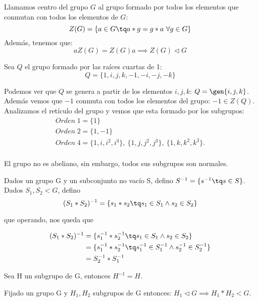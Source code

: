\documentclass[nochap]{apuntes}
\begin{document}
\begin{defn}
	Llamamos centro del grupo $G$ al grupo formado por todos los elementos que conmutan con todos los elementos de $G$:\\
	\[ Z(G) = \{ a\in G\tq a\ast g = g\ast a\ \forall g\in G\} \]
	Además, tenemos que:
	\[ aZ(G)=Z(G)a \implies Z(G)\lhd G \]
  \end{defn}

  \begin{example}
	Sea $Q$ el grupo formado por las raíces cuartas de 1:
	\[ Q = \{ 1, i, j, k, -1, -i, -j, -k\} \]

	Podemos ver que $Q$ se genera a partir de los elementos $i, j, k$: $Q = \gen{i,j,k}$.
	Además vemos que $-1$ conmuta con todos los elementos del grupo: $-1 \in Z(Q)$.
	Analizamos el retículo del grupo y vemos que esta formado por los subgrupos:
	\begin{gather*}
	Orden\; 1 = \{ 1\}\\
	Orden\; 2 = \{ 1, -1\} \\
	Orden\; 4 = \{ 1, i, i^2, i^3\},\
			  \{ 1, j, j^2, j^3 \},\
			  \{ 1, k, k^2, k^3 \}.\\
			  \end{gather*}


	El grupo no es abeliano, sin embargo, todos sus subgrupos son normales.

  \end{example}


 Dados un grupo G y un subconjunto no vacío S, defino $S^{-1}=\{s^{-1}\tq s\in S\}$. Dados $S_{1},S_{2}<G$, defino  \[ (S_{1}\ast S_{2})^{-1}=\{s_{1}\ast s_{2}\tq s_{1}\in S_{1} \wedge s_{2}\in S_{2}\} \]

 que operando, nos queda que

 \begin{align*}
 (S_1 \ast S_2)^{-1} &= \{s_{1}^{-1}\ast s_{2}^{-1}\tq s_{1}\in S_{1} \wedge s_{2}\in S_{2}\}\\
 &= \{s_{1}^{-1}\ast s_{2}^{-1}\tq s_{1}^{-1}\in S_{1}^{-1} \wedge s_{2}^{-1}\in S_{2}^{-1}\} \\
 & =S_{2}^{-1}\ast S_{1}^{-1}
 \end{align*}

 Sea H un subgrupo de G, entonces $H^{-1}=H$.

 \begin{theorem}
  Fijado un grupo G y $H_{1}, H_{2}$  subgrupos de G entonces: $H_{1} \lhd G \implies H_{1}\ast H_{2}<G$.
 \end{theorem}
\end{document}

